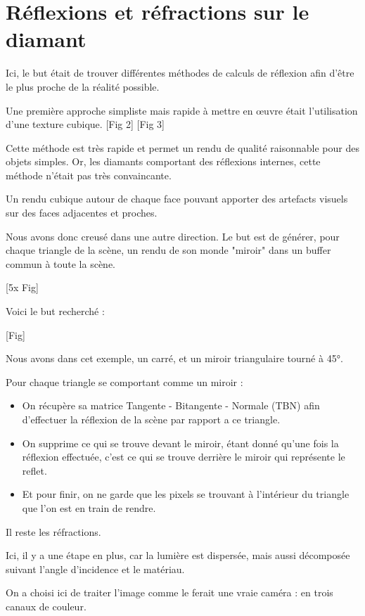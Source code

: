 \section{Réflexions et réfractions sur le diamant}

Ici, le but était de trouver différentes méthodes de calculs de réflexion afin d'être le plus proche de la réalité possible.

Une première approche simpliste mais rapide à mettre en œuvre était l'utilisation d'une texture cubique. [Fig 2] [Fig 3]

Cette méthode est très rapide et permet un rendu de qualité raisonnable pour des objets simples.
Or, les diamants comportant des réflexions internes, cette méthode n'était pas très convaincante.

Un rendu cubique autour de chaque face pouvant apporter des artefacts visuels sur des faces adjacentes et proches.

Nous avons donc creusé dans une autre direction. Le but est de générer, pour chaque triangle de la scène,
un rendu de son monde "miroir" dans un buffer commun à toute la scène.

[5x Fig]

Voici le but recherché :

[Fig]

Nous avons dans cet exemple, un carré, et un miroir triangulaire tourné à 45°.

Pour chaque triangle se comportant comme un miroir :

\begin{itemize}
    \item On récupère sa matrice Tangente - Bitangente - Normale (TBN) afin d'effectuer la
        réflexion de la scène par rapport a ce triangle.
    \item On supprime ce qui se trouve devant le miroir, étant donné qu'une fois la réflexion
        effectuée, c'est ce qui se trouve derrière le miroir qui représente le reflet.
    \item Et pour finir, on ne garde que les pixels se trouvant à l'intérieur du triangle que
        l'on est en train de rendre.
\end{itemize}

Il reste les réfractions.

Ici, il y a une étape en plus, car la lumière est dispersée, mais aussi décomposée suivant l'angle
d'incidence et le matériau.

On a choisi ici de traiter l'image comme le ferait une vraie caméra : en trois canaux de couleur.

